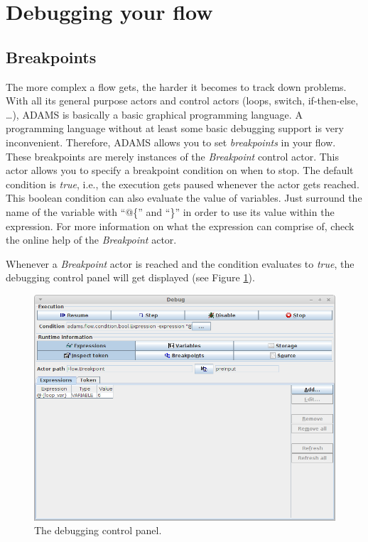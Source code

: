 \newpage
\section{Debugging your flow}
\label{debugging_flow}
\subsection{Breakpoints}
The more complex a flow gets, the harder it becomes to track down problems. With
all its general purpose actors and control actors (loops, switch, if-then-else,
\ldots), ADAMS is basically a basic graphical programming language. A
programming language without at least some basic debugging support is very
inconvenient. Therefore, ADAMS allows you to set \textit{breakpoints} in your
flow. These breakpoints are merely instances of the \textit{Breakpoint} control
actor. This actor allows you to specify a breakpoint condition on when to stop.
The default condition is \textit{true}, i.e., the execution gets paused whenever
the actor gets reached. This boolean condition can also evaluate the value of
variables. Just surround the name of the variable with ``@\{'' and ``\}'' in
order to use its value within the expression. For more information on what the
expression can comprise of, check the online help of the \textit{Breakpoint}
actor.

Whenever a \textit{Breakpoint} actor is reached and the condition evaluates to
\textit{true}, the debugging control panel will get displayed (see Figure
\ref{floweditor-debugging1_controlpanel}).
\begin{figure}[htb]
  \centering
  \includegraphics[width=12.0cm]{images/floweditor-debugging1_controlpanel.png}
  \caption{The debugging control panel.}
  \label{floweditor-debugging1_controlpanel}
\end{figure}

